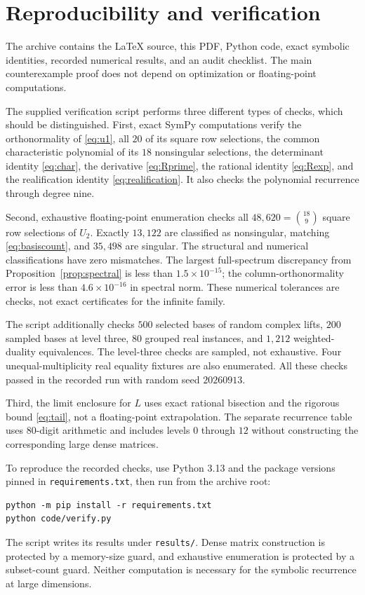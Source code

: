 \documentclass[11pt,letterpaper]{article}
\theoremstyle{definition}
\theoremstyle{remark}
\begin{document}
\section{Reproducibility and verification}

The archive contains the LaTeX source, this PDF, Python code, exact symbolic identities, recorded numerical results, and an audit checklist. The main counterexample proof does not depend on optimization or floating-point computations.

The supplied verification script performs three different types of checks, which should be distinguished. First, exact SymPy computations verify the orthonormality of \eqref{eq:u1}, all $20$ of its square row selections, the common characteristic polynomial of its $18$ nonsingular selections, the determinant identity \eqref{eq:char}, the derivative \eqref{eq:Rprime}, the rational identity \eqref{eq:Rexp}, and the realification identity \eqref{eq:realification}. It also checks the polynomial recurrence through degree nine.

Second, exhaustive floating-point enumeration checks all $48{,}620=\binom{18}{9}$ square row selections of $U_2$. Exactly $13{,}122$ are classified as nonsingular, matching \eqref{eq:basiscount}, and $35{,}498$ are singular. The structural and numerical classifications have zero mismatches. The largest full-spectrum discrepancy from Proposition~\ref{prop:spectral} is less than $1.5\times10^{-15}$; the column-orthonormality error is less than $4.6\times10^{-16}$ in spectral norm. These numerical tolerances are checks, not exact certificates for the infinite family.

The script additionally checks $500$ selected bases of random complex lifts, $200$ sampled bases at level three, $80$ grouped real instances, and $1{,}212$ weighted-duality equivalences. The level-three checks are sampled, not exhaustive. Four unequal-multiplicity real equality fixtures are also enumerated. All these checks passed in the recorded run with random seed $20260913$.

Third, the limit enclosure for $L$ uses exact rational bisection and the rigorous bound \eqref{eq:tail}, not a floating-point extrapolation. The separate recurrence table uses $80$-digit arithmetic and includes levels $0$ through $12$ without constructing the corresponding large dense matrices.

To reproduce the recorded checks, use Python 3.13 and the package versions pinned in \texttt{requirements.txt}, then run from the archive root:
\begin{verbatim}
python -m pip install -r requirements.txt
python code/verify.py
\end{verbatim}
The script writes its results under \texttt{results/}. Dense matrix construction is protected by a memory-size guard, and exhaustive enumeration is protected by a subset-count guard. Neither computation is necessary for the symbolic recurrence at large dimensions.
\end{document}
